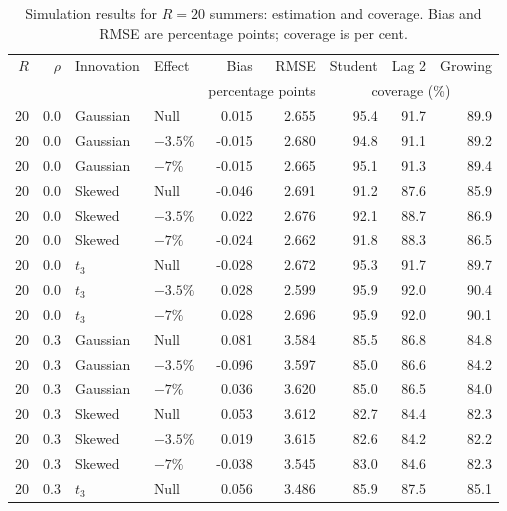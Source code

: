\begingroup


\scriptsize
\setlength{\tabcolsep}{3.5pt}
\begin{table}[H]
\centering
\normalsize\renewcommand{\arraystretch}{1.55}\setlength{\tabcolsep}{4pt}
\caption{Simulation results for $R=20$ summers: estimation and coverage. Bias and RMSE are percentage points; coverage is per cent.}
\label{tab:year-simulation-complete-a}
\begin{tabular*}{\textwidth}{@{\extracolsep{\fill}}rrllrrrrr}
\toprule
$R$ & $\rho$ & Innovation & Effect & Bias & RMSE & Student & Lag 2 & Growing \\
 & & & & \multicolumn{2}{c}{percentage points} & \multicolumn{3}{c}{coverage (\%)} \\
\midrule
20 & 0.0 & Gaussian & Null & 0.015 & 2.655 & 95.4 & 91.7 & 89.9 \\
20 & 0.0 & Gaussian & $-3.5\%$ & -0.015 & 2.680 & 94.8 & 91.1 & 89.2 \\
20 & 0.0 & Gaussian & $-7\%$ & -0.015 & 2.665 & 95.1 & 91.3 & 89.4 \\
20 & 0.0 & Skewed & Null & -0.046 & 2.691 & 91.2 & 87.6 & 85.9 \\
20 & 0.0 & Skewed & $-3.5\%$ & 0.022 & 2.676 & 92.1 & 88.7 & 86.9 \\
20 & 0.0 & Skewed & $-7\%$ & -0.024 & 2.662 & 91.8 & 88.3 & 86.5 \\
20 & 0.0 & $t_3$ & Null & -0.028 & 2.672 & 95.3 & 91.7 & 89.7 \\
20 & 0.0 & $t_3$ & $-3.5\%$ & 0.028 & 2.599 & 95.9 & 92.0 & 90.4 \\
20 & 0.0 & $t_3$ & $-7\%$ & 0.028 & 2.696 & 95.9 & 92.0 & 90.1 \\
20 & 0.3 & Gaussian & Null & 0.081 & 3.584 & 85.5 & 86.8 & 84.8 \\
20 & 0.3 & Gaussian & $-3.5\%$ & -0.096 & 3.597 & 85.0 & 86.6 & 84.2 \\
20 & 0.3 & Gaussian & $-7\%$ & 0.036 & 3.620 & 85.0 & 86.5 & 84.0 \\
20 & 0.3 & Skewed & Null & 0.053 & 3.612 & 82.7 & 84.4 & 82.3 \\
20 & 0.3 & Skewed & $-3.5\%$ & 0.019 & 3.615 & 82.6 & 84.2 & 82.2 \\
20 & 0.3 & Skewed & $-7\%$ & -0.038 & 3.545 & 83.0 & 84.6 & 82.3 \\
20 & 0.3 & $t_3$ & Null & 0.056 & 3.486 & 85.9 & 87.5 & 85.1 \\

\end{tabular*}
\end{table}
